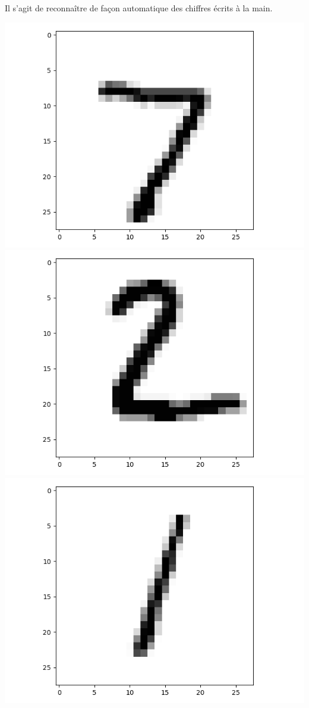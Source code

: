 \documentclass[11pt,class=report,crop=false]{standalone}
\begin{document}
Il s'agit de reconnaître de façon automatique des chiffres écrits à la main.
\begin{center}
\includegraphics[scale=\myscale,scale=0.20]{figures/tf2-chiffre-test-0}
\includegraphics[scale=\myscale,scale=0.20]{figures/tf2-chiffre-test-1}
\includegraphics[scale=\myscale,scale=0.20]{figures/tf2-chiffre-test-2}

\end{center}
\end{document}
